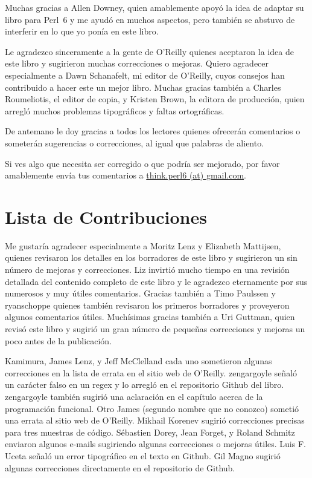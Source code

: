 Muchas gracias a Allen Downey, quien amablemente apoyó la idea
de adaptar su libro para Perl~6 y me ayudó en muchos aspectos,
pero también se abstuvo de interferir en lo que yo ponía en este
libro.

Le agradezco sinceramente a la gente de O'Reilly quienes 
aceptaron la idea de este libro y sugirieron muchas correcciones o 
mejoras. Quiero agradecer especialmente a Dawn Schanafelt, mi editor de 
O'Reilly, cuyos consejos han contribuido a hacer este un mejor libro.
Muchas gracias también a Charles Roumeliotis, el editor de copia, y 
Kristen Brown, la editora de producción, quien arregló muchos problemas
tipográficos y faltas ortográficas.

De antemano le doy gracias a todos los lectores quienes ofrecerán comentarios
o someterán sugerencias o correcciones, al igual que palabras de aliento.

Si ves algo que necesita ser corregido o que podría ser mejorado,
por favor amablemente envía tus comentarios a 
\url{think.perl6 (at) gmail.com}.


\section*{Lista de Contribuciones}

Me gustaría agradecer especialmente a Moritz Lenz y Elizabeth 
Mattijsen, quienes revisaron los detalles en los borradores de este 
libro y sugirieron un sin número de mejoras y correcciones.
Liz invirtió mucho tiempo en una revisión detallada del contenido
completo de este libro y le agradezco eternamente por sus numerosos
y muy útiles comentarios. Gracias también a Timo Paulssen y ryanschoppe quienes
también revisaron los primeros borradores y proveyeron algunos comentarios
útiles. Muchísimas gracias también a Uri Guttman, quien revisó este libro
y sugirió un gran número de pequeñas correcciones y mejoras un poco antes
de la publicación.  

Kamimura, James Lenz, y Jeff McClelland cada uno sometieron algunas correcciones
en la lista de errata en el sitio web de O'Reilly. zengargoyle señaló un carácter
falso en un regex y lo arregló en el repositorio Github del libro. zengargoyle
también sugirió una aclaración en el capítulo acerca de la programación
funcional. Otro James (segundo nombre que no conozco) sometió una errata
al sitio web de O'Reilly. Mikhail Korenev sugirió correcciones precisas
para tres muestras de código. Sébastien Dorey, Jean Forget, y Roland Schmitz 
enviaron algunos e-mails sugiriendo algunas correcciones o mejoras útiles. 
Luis F. Uceta señaló un error tipográfico en el texto en Github. Gil Magno 
sugirió algunas correcciones directamente en el repositorio de Github.

\clearemptydoublepage

\begin{latexonly}

\tableofcontents

\clearemptydoublepage

\end{latexonly}

